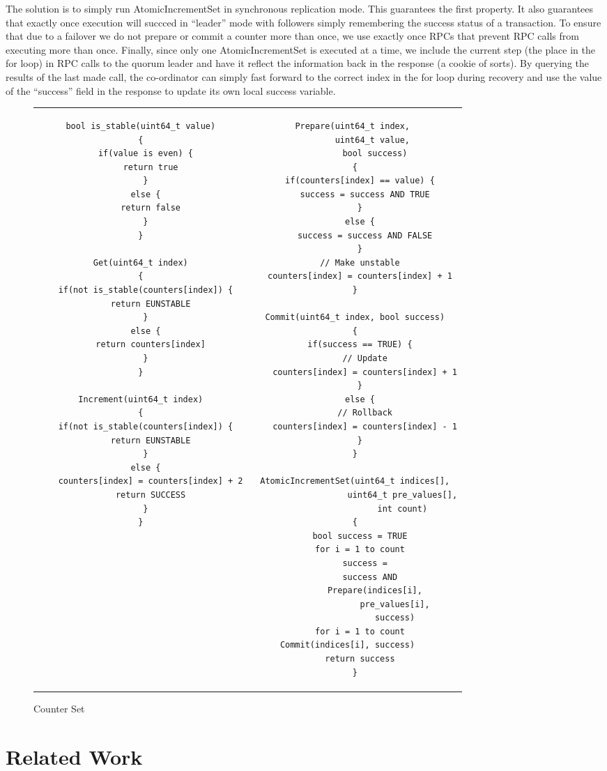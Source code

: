 \documentclass[twocolumn]{article}
\begin{document}
The solution is to simply run AtomicIncrementSet in synchronous replication
mode. This guarantees the first property. It also guarantees that exactly once
execution will succced in ``leader'' mode with followers simply remembering the
success status of a transaction. To ensure that due to a failover we do not
prepare or commit a counter more than once, we use exactly once RPCs that
prevent RPC calls from executing more than once. Finally, since only
one AtomicIncrementSet is executed at a time, we include the current step (the
place in the for loop) in RPC calls to the quorum leader and have it reflect the
information back in the response (a cookie of sorts). By querying the results of
the last made call, the co-ordinator can simply fast forward to the correct
index in the for loop during recovery and use the value of the ``success'' field
in the response to update its own local success variable.


\begin{figure*}
\begin{tabular}{cc}    
\begin{minipage}{0.5\textwidth}  
{ \scriptsize
\begin{verbatim}
bool is_stable(uint64_t value)
{
  if(value is even) {
    return true
  }
  else {
    return false
  }
}

Get(uint64_t index)
{
  if(not is_stable(counters[index]) {
    return EUNSTABLE
  }
  else {
    return counters[index]
  }
}

Increment(uint64_t index)
{
  if(not is_stable(counters[index]) {
    return EUNSTABLE
  }
  else {
    counters[index] = counters[index] + 2
    return SUCCESS
  }
}
\end{verbatim}
}
\end{minipage} &
\begin{minipage}{0.5\textwidth}  
{ \scriptsize
\begin{verbatim}
Prepare(uint64_t index, 
        uint64_t value, 
        bool success)
{
  if(counters[index] == value) {
    success = success AND TRUE
  }
  else {
    success = success AND FALSE
  }
  // Make unstable
  counters[index] = counters[index] + 1
}

Commit(uint64_t index, bool success)
{
  if(success == TRUE) {
    // Update
    counters[index] = counters[index] + 1
  }
  else {
    // Rollback
    counters[index] = counters[index] - 1
  }
}

AtomicIncrementSet(uint64_t indices[],
                   uint64_t pre_values[],
                   int count)
{
  bool success = TRUE
  for i = 1 to count
    success =
      success AND
        Prepare(indices[i],
                pre_values[i],
                success)
  for i = 1 to count
    Commit(indices[i], success)       
  return success
}
\end{verbatim}
}
\end{minipage}
\end{tabular}
\caption{Counter Set}
\label{fig:counter_set}
\end{figure*}

\section{Related Work}
\end{document}
